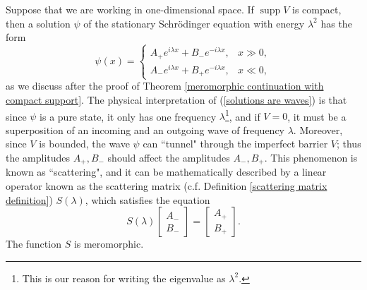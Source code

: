 \documentclass[12pt]{report}
\DeclareMathOperator{\supp}{supp}
\theoremstyle{definition}
\begin{document}
Suppose that we are working in one-dimensional space. If $\supp V$ is compact, then a solution $\psi$ of the stationary Schrödinger equation
with energy $\lambda^2$ has the form
\begin{equation}
\label{solutions are waves}
\psi(x) = \begin{cases}
  A_+ e^{i\lambda x} + B_-e^{-i\lambda x}, &x \gg 0,\\
  A_- e^{i\lambda x} + B_+e^{-i\lambda x}, &x \ll 0,
\end{cases}
\end{equation}
as we discuss after the proof of Theorem \ref{meromorphic continuation with compact support}.
The physical interpretation of (\ref{solutions are waves}) is that since $\psi$ is a pure state, it only has one frequency $\lambda$\footnote{This is our reason for writing the eigenvalue as $\lambda^2$.}, and if $V = 0$, it must be a superposition of an incoming and an outgoing wave of frequency $\lambda$.
Moreover, since $V$ is bounded, the wave $\psi$ can ``tunnel" through the imperfect barrier $V$; thus the amplitudes $A_+,B_-$ should affect the amplitudes $A_-,B_+$.
This phenomenon is known as ``scattering", and it can be mathematically described by a linear operator known as the scattering matrix (c.f. Definition \ref{scattering matrix definition}) $S(\lambda)$, which satisfies the equation
$$S(\lambda)\begin{bmatrix}A_-\\B_-\end{bmatrix} = \begin{bmatrix}A_+\\B_+\end{bmatrix}.$$
The function $S$ is meromorphic.
\end{document}
